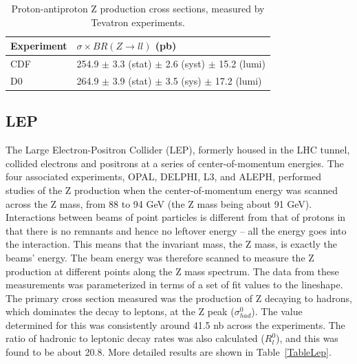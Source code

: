 \begin{table}[htbp]
  \begin{center}
    \caption{Proton-antiproton Z production cross sections, measured by Tevatron experiments.}
    \label{TableTevatron}
    \begin{tabular}[]{ | l | l | }
      \hline
      Experiment & $\sigma \times BR(Z \rightarrow ll)$ (pb) \\ \hline \hline
      CDF & 254.9 $\pm$ 3.3 (stat) $\pm$ 2.6 (syst) $\pm$ 15.2 (lumi) \\ \hline
      D0 & 264.9 $\pm$ 3.9 (stat) $\pm$ 3.5 (sys) $\pm$ 17.2 (lumi) \\ \hline
    \end{tabular}
  \end{center}
\end{table}



\subsection{LEP}

The Large Electron-Positron Collider (LEP), 
formerly housed in the LHC tunnel, 
collided electrons and positrons at a 
series of center-of-momentum energies.  
The four associated experiments, 
OPAL, DELPHI, L3, and ALEPH, performed studies of 
the Z production 
when the center-of-momentum energy 
was scanned across the Z mass, 
from 88 to 94 GeV (the Z mass being about 91 GeV).  
Interactions between beams of point particles 
is different from that of protons in that there is no 
remnants and hence no leftover energy -- 
all the energy goes into the interaction.  
This means that the invariant mass, 
the Z mass, is exactly the beams' energy.  
The beam energy was therefore scanned 
to measure the Z production at different 
points along the Z mass spectrum.  
The data from these measurements was parameterized 
in terms of a set of fit values to the lineshape.  
The primary cross section measured was the production 
of Z decaying to hadrons, which dominates the decay 
to leptons, at the Z peak ($\sigma_{had}^0$).  
The value determined for this was consistently 
around 41.5 nb across the experiments.  
The ratio of hadronic to leptonic decay rates 
was also calculated ($R_l^0$), 
and this was found to be about 20.8.  
More detailed results 
are shown in Table~\ref{TableLep}.  


